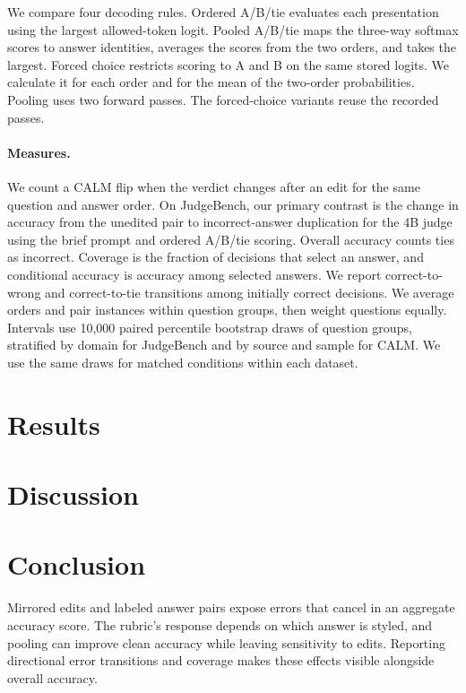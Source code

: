\documentclass[11pt]{article}
\begin{document}
We compare four decoding rules. Ordered A/B/tie evaluates each
presentation using the largest allowed-token logit. Pooled A/B/tie
maps the three-way softmax scores to answer identities, averages the
scores from the two orders, and takes the largest. Forced choice
restricts scoring to A and B on the same stored logits. We calculate
it for each order and for the mean of the two-order probabilities.
Pooling uses two forward passes. The forced-choice variants reuse
the recorded passes.

\paragraph{Measures.}
We count a CALM flip when the verdict changes after an edit for the
same question and answer order. On JudgeBench, our primary contrast
is the change in accuracy from the unedited pair to
incorrect-answer duplication for the 4B judge using the brief prompt
and ordered A/B/tie scoring. Overall accuracy counts ties as incorrect.
Coverage is the fraction of decisions that select an answer, and
conditional accuracy is accuracy among selected answers. We report
correct-to-wrong and correct-to-tie transitions among initially correct
decisions. We average orders and pair instances within question groups,
then weight questions equally. Intervals use 10,000 paired percentile
bootstrap draws of question groups, stratified by domain for JudgeBench
and by source and sample for CALM. We use the same draws for matched
conditions within each dataset.

\section{Results}


\section{Discussion}


\section{Conclusion}
Mirrored edits and labeled answer pairs expose errors that cancel in an
aggregate accuracy score. The rubric's response depends on which answer
is styled, and pooling can improve clean accuracy while leaving sensitivity
to edits. Reporting directional error transitions and coverage makes these
effects visible alongside overall accuracy.
\end{document}
